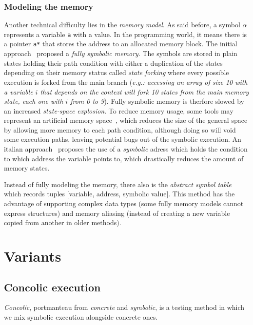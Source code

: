 \documentclass[11pt]{IEEEtran}
\begin{document}
      \subsubsection{Modeling the memory}
        Another technical difficulty lies in the \emph{memory model}. As said before, a symbol $\alpha$ represents a variable \texttt{a} with a value. In the programming world, it means there is a pointer \texttt{a*} that stores the address to an allocated memory block. The initial approach~\cite{newapproach} proposed a \emph{fully symbolic memory}. The symbols are stored in plain states holding their path condition with either a duplication of the states depending on their memory status called \emph{state forking} where every possible execution is forked from the main branch (\emph{e.g.: accessing an array of size 10 with a variable $i$ that depends on the context will fork 10 states from the main memory state, each one with $i$ from 0 to 9}). Fully symbolic memory is therfore slowed by an increased \emph{state-space explosion}. To reduce memory usage, some tools may represent an artificial memory space~\cite{5635129}, which reduces the size of the general space by allowing more memory to each path condition, although doing so will void some execution paths, leaving potential bugs out of the symbolic execution. An italian approach~\cite{memorymodelpointers} proposes the use of a \emph{symbolic} adress which holds the condition to which address the variable points to, which drastically reduces the amount of memory states.

        Instead of fully modeling the memory, there also is the \emph{abstract symbol table}~\cite{memorytablemodel} which records tuples [variable, address, symbolic value]. This method has the advantage of supporting complex data types (some fully memory models cannot express structures) and memory aliasing (instead of creating a new variable copied from another in older methods).
  \section{Variants}
    \subsection{Concolic execution}
    \label{subsec:concolicExecution}
    	\emph{Concolic}, portmanteau from \emph{concrete} and \emph{symbolic}, is a testing method in which we mix symbolic execution alongside concrete ones.\\
\end{document}
